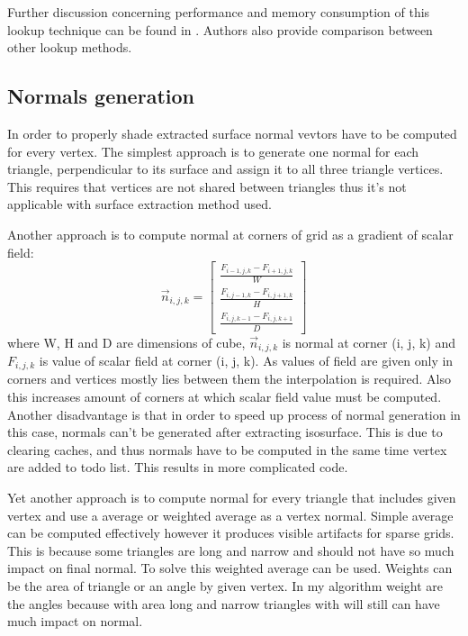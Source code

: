 Further discussion concerning performance and memory consumption of this lookup technique can be found in \cite{RosenbergBirdwell2008}. Authors also provide comparison between other lookup methods. 

\subsection{Normals generation}\label{sec:normals}
In order to properly shade extracted surface normal vevtors have to be computed for every vertex. The simplest approach is to generate one normal for each triangle, perpendicular to its surface and assign it to all three triangle vertices. This requires that vertices are not shared between triangles thus it's not applicable with surface extraction method used. 

Another approach is to compute normal at corners of grid as a gradient of scalar field: 
\begin{equation}
	\vec{n}_{i,j,k} = 
	\begin{bmatrix}
		\frac{F_{i-1, j, k} - F_{i+1, j, k}}{W}\\	
		\frac{F_{i, j-1, k} - F_{i, j+1, k}}{H}\\	
		\frac{F_{i, j, k-1} - F_{i, j, k+1}}{D}
	\end{bmatrix}
\end{equation}
where W, H and D are dimensions of cube, $\vec{n}_{i, j, k}$ is normal at corner (i, j, k) and $F_{i, j, k}$ is value of scalar field at corner (i, j, k).
As values of field are given only in corners and vertices mostly lies between them the interpolation is required. Also this increases amount of corners at which scalar field value must be computed. Another disadvantage is that in order to speed up process of normal generation in this case, normals can't be generated after extracting isosurface. This is due to clearing caches, and thus normals have to be computed in the same time vertex are added to todo list. This results in more complicated code.


Yet another approach is to compute normal for every triangle that includes given vertex and use a average or weighted average as a vertex normal. Simple average can be computed effectively however it produces visible artifacts for sparse grids. This is because some triangles are long and narrow and should not have so much impact on final normal. To solve this weighted average can be used. Weights can be the area of triangle or an angle by given vertex. In my algorithm weight are the angles because with area long and narrow triangles with will still can have much impact on normal. 

